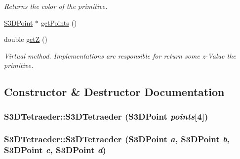 \begin{DoxyCompactItemize}
\begin{DoxyCompactList}\small\item\em Returns the color of the primitive. \item\end{DoxyCompactList}\item 
\hyperlink{class_s3_d_point}{S3DPoint} $\ast$ \hyperlink{class_s3_d_tetraeder_a2be4bd418fda569bf8bbfc0fbd70ef1b}{getPoints} ()
\item 
double \hyperlink{class_s3_d_tetraeder_a5f77481efa810aafb63e9d1d5c14ceea}{getZ} ()
\begin{DoxyCompactList}\small\item\em Virtual method. Implementations are responsible for return some z-\/Value the primitive. \item\end{DoxyCompactList}\end{DoxyCompactItemize}


\subsection{Constructor \& Destructor Documentation}
\hypertarget{class_s3_d_tetraeder_ac70078c42e24160a8759fafff847ee30}{
\subsubsection[{S3DTetraeder}]{\setlength{\rightskip}{0pt plus 5cm}S3DTetraeder::S3DTetraeder ({\bf S3DPoint} {\em points}\mbox{[}4\mbox{]})}}
\label{class_s3_d_tetraeder_ac70078c42e24160a8759fafff847ee30}
\hypertarget{class_s3_d_tetraeder_a98dc7f23bd82419321b7a086159e25d3}{
\subsubsection[{S3DTetraeder}]{\setlength{\rightskip}{0pt plus 5cm}S3DTetraeder::S3DTetraeder ({\bf S3DPoint} {\em a}, \/  {\bf S3DPoint} {\em b}, \/  {\bf S3DPoint} {\em c}, \/  {\bf S3DPoint} {\em d})}}
\label{class_s3_d_tetraeder_a98dc7f23bd82419321b7a086159e25d3}



